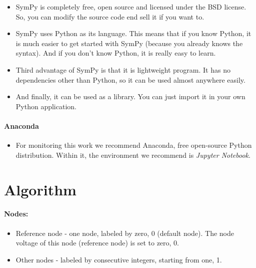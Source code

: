 \documentclass[11pt]{article}
\providecommand{\tightlist}{%
      \setlength{\itemsep}{0pt}\setlength{\parskip}{0pt}}
\begin{document}
\begin{itemize}
\item
  SymPy is completely free, open source and licensed under the BSD
  license. So, you can modify the source code end sell it if you want
  to.
\item
  SymPy uses Python as its language. This means that if you know Python,
  it is much easier to get started with SymPy (because you already knows
  the syntax). And if you don't know Python, it is really easy to learn.
\item
  Third advantage of SymPy is that it is lightweight program. It has no
  dependencies other than Python, so it can be used almost anywhere
  easily.
\item
  And finally, it can be used as a library. You can just import it in
  your own Python application.
\end{itemize}

\newpage
\hypertarget{anaconda}{%
\paragraph{Anaconda}\label{anaconda}}

\begin{itemize}
\tightlist
\item
  For monitoring this work we recommend Anaconda, free open-source
  Python distribution. Within it, the environment we recommend is
  \emph{Jupyter Notebook}.
\end{itemize}

\hypertarget{algorithm}{%
\section{Algorithm}\label{algorithm}}

\hypertarget{nodes}{%
\paragraph{Nodes:}\label{nodes}}

\begin{itemize}
\tightlist
\item
  Reference node - one node, labeled by zero, 0 (default node). The node
  voltage of this node (reference node) is set to zero, 0.
\item
  Other nodes - labeled by consecutive integers, starting from one, 1.
\end{itemize}
\end{document}
